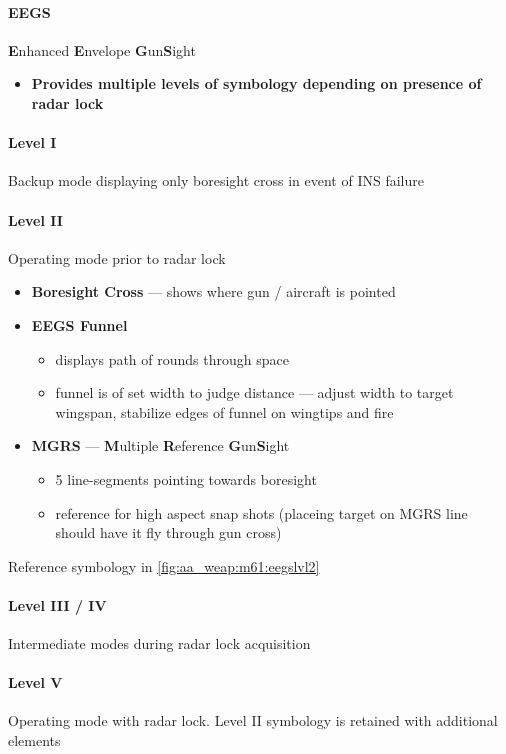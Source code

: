 \paragraph{EEGS} 
\textbf{E}nhanced \textbf{E}nvelope \textbf{G}un\textbf{S}ight

\begin{itemize}
    \item \textbf{Provides multiple levels of symbology depending on presence of radar lock}
\end{itemize}
\paragraph{Level I} Backup mode displaying only boresight cross in event of INS failure
\paragraph{Level II}
Operating mode prior to radar lock

\begin{itemize}
    \item \textbf{Boresight Cross} --- shows where gun / aircraft is pointed
    \item \textbf{EEGS Funnel}
    \begin{itemize}
        \item displays path of rounds through space
        \item funnel is of set width to judge distance --- adjust width to target wingspan, stabilize edges of funnel on wingtips and fire
    \end{itemize}
    \item \textbf{MGRS} --- \textbf{M}ultiple \textbf{R}eference \textbf{G}un\textbf{S}ight
    \begin{itemize}
        \item 5 line-segments pointing towards boresight
        \item reference for high aspect snap shots (placeing target on MGRS line should have it fly through gun cross)
    \end{itemize}
\end{itemize}

Reference symbology in \cref{fig:aa_weap:m61:eegslvl2}
\paragraph{Level III / IV} Intermediate modes during radar lock acquisition
\paragraph{Level V}
Operating mode with radar lock. Level II symbology is retained with additional elements

